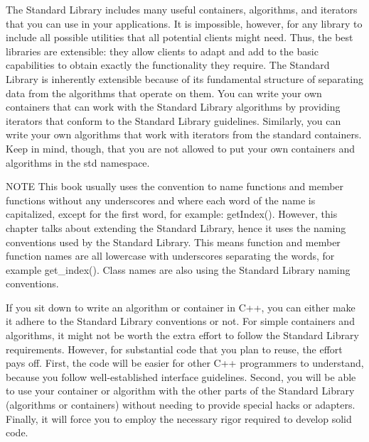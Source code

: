 
The Standard Library includes many useful containers, algorithms, and iterators that you can use in your applications. It is impossible, however, for any library to include all possible utilities that all potential clients might need. Thus, the best libraries are extensible: they allow clients to adapt and add to the basic capabilities to obtain exactly the functionality they require. The Standard Library is inherently extensible because of its fundamental structure of separating data from the algorithms that operate on them. You can write your own containers that can work with the Standard Library algorithms by providing iterators that conform to the Standard Library guidelines. Similarly, you can write your own algorithms that work with iterators from the standard containers. Keep in mind, though, that you are not allowed to put your own containers and algorithms in the std namespace.

\begin{myNotic}{NOTE}
This book usually uses the convention to name functions and member functions without any underscores and where each word of the name is capitalized, except for the first word, for example: getIndex(). However, this chapter talks about extending the Standard Library, hence it uses the naming conventions used by the Standard Library. This means function and member function names are all lowercase with underscores separating the words, for example get\_index(). Class names are also using the Standard Library naming conventions.
\end{myNotic}


If you sit down to write an algorithm or container in C++, you can either make it adhere to the Standard Library conventions or not. For simple containers and algorithms, it might not be worth the extra effort to follow the Standard Library requirements. However, for substantial code that you plan to reuse, the effort pays off. First, the code will be easier for other C++ programmers to understand, because you follow well-established interface guidelines. Second, you will be able to use your container or algorithm with the other parts of the Standard Library (algorithms or containers) without needing to provide special hacks or adapters. Finally, it will force you to employ the necessary rigor required to develop solid code.


